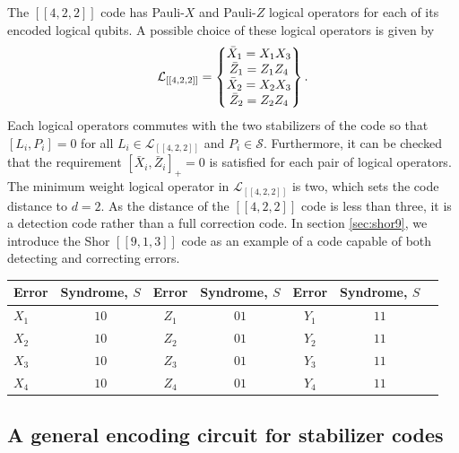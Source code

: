 \documentclass[]{arxiv}
\theoremstyle{plain}%
\theoremstyle{definition}
\theoremstyle{remark}
\begin{document}
The $[[4,2,2]]$ code has Pauli-$X$ and Pauli-$Z$ logical operators for each of its encoded logical qubits. A possible choice of these logical operators is given by
%
\begin{equation}
\mathcal{L}_{[[4,2,2]]}=\left\{
\begin{matrix}
\bar{X}_1=X_1X_3\\
\bar{Z}_1=Z_1Z_4\\
\bar{X}_2=X_2X_3\\
\bar{Z}_2=Z_2Z_4
\end{matrix}
\right\}\rm.
\end{equation}
%
Each logical operators commutes with the two stabilizers of the code so that $\left[L_i, P_i\right]=0$ for all $L_i\in\mathcal{L}_{[[4,2,2]]}$ and $P_i\in\mathcal{S}$. Furthermore, it can be checked that the requirement $\left[ \bar{X}_i, \bar{Z}_i \right]_{+}=0$ is satisfied for each pair of logical operators. The minimum weight logical operator in $\mathcal{L}_{[[4,2,2]]}$ is two, which sets the code distance to $d=2$. As the distance of the $[[4,2,2]]$ code is less than three, it is a detection code rather than a full correction code. In section \ref{sec:shor9}, we introduce the Shor $[[9,1,3]]$ code as an example of a code capable of both detecting and correcting errors.




\begin{table}
	\def\arraystretch{1.3}
	{\begin{tabular}{lc|cc|ccc} \toprule
			Error & Syndrome, $S$ & Error & Syndrome, $S$& Error & Syndrome, $S$\\\midrule
			$X_1$ & $10$ & $Z_1$ & $01$& $Y_1$ & $11$\\
			$X_2$ & $10$ & $Z_2$ & $01$& $Y_2$ & $11$\\
			$X_3$ & $10$ & $Z_3$ & $01$& $Y_3$ & $11$\\
			$X_4$ & $10$ & $Z_4$ & $01$& $Y_4$ & $11$\\
			\bottomrule
	\end{tabular}}
	\label{tab:four_qubit}
\end{table}


\subsection{A general encoding circuit for stabilizer codes}\label{sec:gen_encoder}
\end{document}
